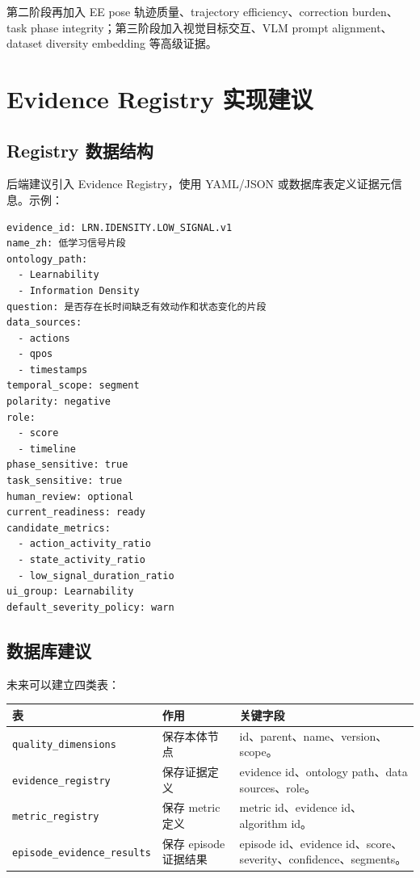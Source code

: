 \documentclass[UTF8,zihao=-4]{ctexart}
\newcommand{\Code}[1]{\texttt{#1}}
\begin{document}
第二阶段再加入 EE pose 轨迹质量、trajectory efficiency、correction burden、task phase integrity；第三阶段加入视觉目标交互、VLM prompt alignment、dataset diversity embedding 等高级证据。

\section{Evidence Registry 实现建议}

\subsection{Registry 数据结构}

后端建议引入 Evidence Registry，使用 YAML/JSON 或数据库表定义证据元信息。示例：

\begin{verbatim}
evidence_id: LRN.IDENSITY.LOW_SIGNAL.v1
name_zh: 低学习信号片段
ontology_path:
  - Learnability
  - Information Density
question: 是否存在长时间缺乏有效动作和状态变化的片段
data_sources:
  - actions
  - qpos
  - timestamps
temporal_scope: segment
polarity: negative
role:
  - score
  - timeline
phase_sensitive: true
task_sensitive: true
human_review: optional
current_readiness: ready
candidate_metrics:
  - action_activity_ratio
  - state_activity_ratio
  - low_signal_duration_ratio
ui_group: Learnability
default_severity_policy: warn
\end{verbatim}

\subsection{数据库建议}

未来可以建立四类表：

\begin{longtable}{L{3.5cm} L{4.5cm} L{5.6cm}}
\toprule
表 & 作用 & 关键字段 \\
\midrule
\Code{quality\_dimensions} & 保存本体节点 & id、parent、name、version、scope。 \\
\Code{evidence\_registry} & 保存证据定义 & evidence id、ontology path、data sources、role。 \\
\Code{metric\_registry} & 保存 metric 定义 & metric id、evidence id、algorithm id。 \\
\Code{episode\_evidence\_results} & 保存 episode 证据结果 & episode id、evidence id、score、severity、confidence、segments。 \\
\bottomrule
\end{longtable}
\end{document}
